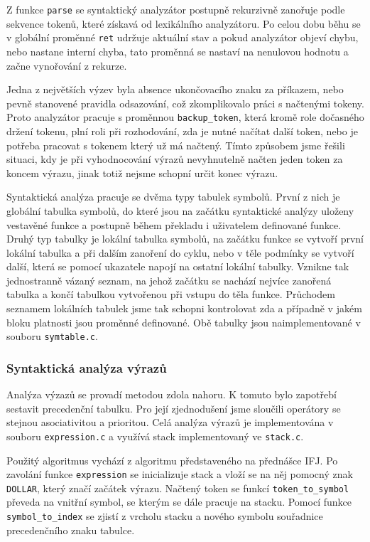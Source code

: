 \documentclass[11pt]{article}
\begin{document}
 Z funkce \texttt{parse} se
 syntaktický analyzátor postupně rekurzivně zanořuje podle sekvence tokenů, které získavá od lexikálního analyzátoru. Po celou
 dobu běhu se v globální proměnné \texttt{ret} udržuje aktuální stav a pokud analyzátor objeví chybu, nebo nastane interní chyba,
 tato proměnná se nastaví na nenulovou hodnotu a začne vynořování z rekurze.

 Jedna z největších výzev byla absence ukončovacího
 znaku za příkazem, nebo pevně stanovené pravidla odsazování, což zkomplikovalo práci s načtenými tokeny. Proto analyzátor pracuje
 s proměnnou \texttt{backup\_token}, která kromě role dočasného držení tokenu, plní roli při rozhodování, zda je nutné načítat
 další token, nebo je potřeba pracovat s tokenem který už má načtený. Tímto způsobem jsme řešili situaci, kdy je při
 vyhodnocování výrazů nevyhnutelně načten jeden token za koncem výrazu, jinak totiž nejsme schopní určit konec výrazu.

 Syntaktická analýza pracuje se dvěma typy tabulek symbolů. První z nich je globální tabulka symbolů, do které jsou na začátku
 syntaktické analýzy uloženy vestavěné funkce a postupně během překladu i uživatelem definované funkce. Druhý typ tabulky je lokální
 tabulka symbolů, na začátku funkce se vytvoří první lokální tabulka a při dalším zanoření do cyklu, nebo v těle podmínky se vytvoří
 další, která se pomocí ukazatele napojí na ostatní lokální tabulky. Vznikne tak jednostranně vázaný seznam, na jehož začátku se nachází
 nejvíce zanořená tabulka a končí tabulkou vytvořenou při vstupu do těla funkce. Průchodem seznamem lokálních tabulek jsme tak
 schopni kontrolovat zda a případně v jakém bloku platnosti jsou proměnné definované. Obě tabulky jsou naimplementované v souboru
 \texttt{symtable.c}.

\subsubsection{Syntaktická analýza výrazů}
Analýza výzazů se provadí metodou zdola nahoru.
K tomuto bylo zapotřebí sestavit precedenční tabulku. Pro její zjednodušení jsme sloučili operátory
se stejnou asociativitou a prioritou. Celá analýza výrazů je implementována v souboru \texttt{expression.c}
a využívá stack implementovaný ve \texttt{stack.c}.

Použitý algoritmus vychází z algoritmu představeného na přednášce IFJ.
Po zavolání funkce \texttt{expression} se inicializuje stack a vloží se na něj pomocný znak \texttt{DOLLAR},
který značí začátek výrazu. Načtený token se funkcí \texttt{token\_to\_symbol} převeda na vnitřní symbol,
se kterým se dále pracuje na stacku. Pomocí funkce \texttt{symbol\_to\_index} se zjistí z vrcholu stacku
a nového symbolu souřadnice precedenčního znaku tabulce.
\end{document}
